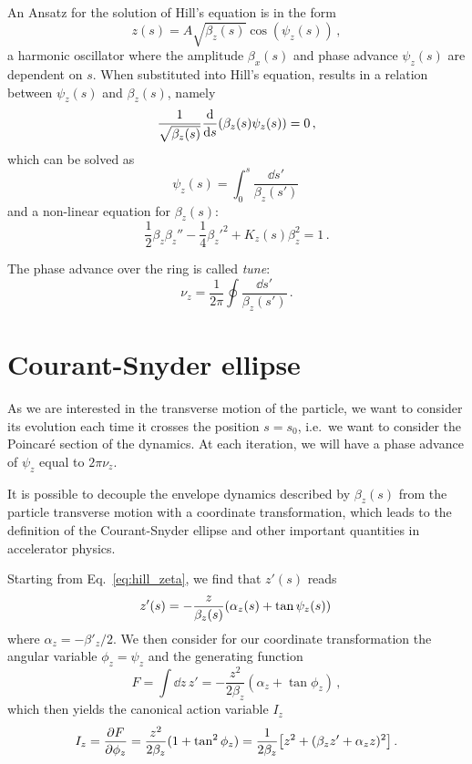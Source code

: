 An Ansatz for the solution of Hill's equation is in the form
\begin{equation}
	z(s)=A\sqrt{\beta_z(s)}\cos\left(\psi_z(s)\right)\,,
	\label{eq:hill_zeta}
\end{equation}
%
\ie a harmonic oscillator where the amplitude $\beta_x(s)$ and phase advance $\psi_z(s)$ are dependent on $s$. When substituted into Hill's equation, results in a relation between $\psi_z(s)$ and $\beta_z(s)$, namely
%
\begin{equation}
	\frac{1}{\sqrt{\beta_z(s)}} \dv{s}(\beta_z(s)\psi_z(s)) = 0\,,
\end{equation}
%
which can be solved as
%
\begin{equation}
	\psi_z(s) = \int_0^s \frac{\dd s'}{\beta_z(s')}\,
\end{equation}
%
and a non-linear equation for $\beta_z(s)$:
%
\begin{equation}
	\frac{1}{2}\beta_z\beta_z''-\frac{1}{4}\beta_z'^2+K_z(s)\beta_z^2=1\,.
\end{equation}

The phase advance over the ring is called \textit{tune}:
\begin{equation}
	\nu_z = \frac{1}{2\pi}\oint \frac{\dd s'}{\beta_z(s')}\,.
    \label{eq:tune_def}
\end{equation} 


\section{Courant-Snyder ellipse}

As we are interested in the transverse motion of the particle, we want to consider its evolution each time it crosses the position $s=s_0$, i.e.\ we want to consider the Poincaré section of the dynamics. At each iteration, we will have a phase advance of $\psi_z$ equal to $2\pi\nu_z$.

It is possible to decouple the envelope dynamics described by $\beta_z(s)$ from the particle transverse motion with a coordinate transformation, which leads to the definition of the Courant-Snyder ellipse and other important quantities in accelerator physics.

Starting from Eq.~\eqref{eq:hill_zeta}, we find that  $z'(s)$ reads
%
\begin{equation}
	z'(s)=-\frac{z}{\beta_z(s)}\qty(\alpha_z(s)+\tan\psi_z(s))\,
\end{equation}
%
where $\alpha_z=-\beta'_z/2$. We then consider for our coordinate transformation the angular variable $\phi_z=\psi_z$ and the generating function
%
\begin{equation}
	F=\int \dd z\, z' = -\frac{z^2}{2\beta_z}(\alpha_z+\tan\phi_z) \,,
\end{equation}
%
which then yields the canonical action variable $I_z$
%
\begin{equation}
	I_z=\pdv{F}{\phi_z}=\frac{z^2}{2\beta_z}(1+\tan^2\phi_z)=\frac{1}{2\beta_z}\qty[z^2+(\beta_z z'+\alpha_z z)^2]\,.
	\label{eq:jz}
\end{equation}


